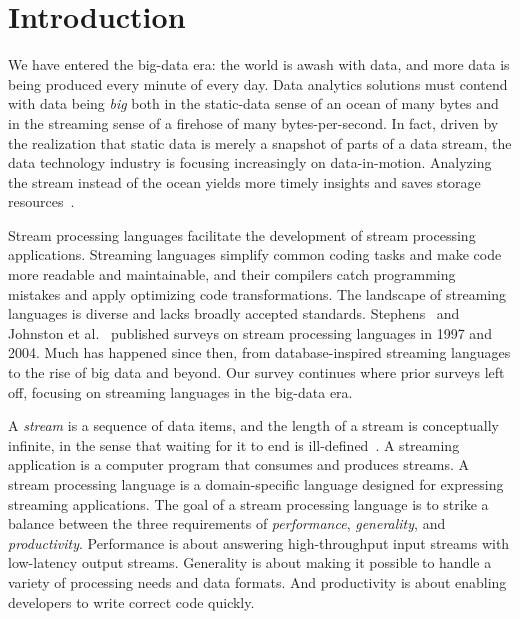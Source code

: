 \section{Introduction}\label{sec:introduction}

We have entered the big-data era: the world is awash with data, and
more data is being produced every minute of every day. Data analytics
solutions must contend with data being \emph{big} both in the static-data sense of
an ocean of many bytes and in the streaming sense of a firehose of
many bytes-per-second. In fact, driven by the realization that static
data is merely a snapshot of parts of a data stream, the data technology
industry is focusing increasingly on data-in-motion. Analyzing
the stream instead of the ocean yields more timely insights and saves
storage resources~\cite{andrade2014fundamentals}.

Stream processing languages facilitate the development of stream
processing applications. Streaming languages simplify common coding tasks
and make code more readable and maintainable, and their
compilers catch programming mistakes and apply optimizing code
transformations. The landscape of streaming languages is diverse and
lacks broadly accepted standards.  Stephens~\cite{stephens_1997} and
Johnston et al.~\cite{johnston_hanna_millar_2004} published surveys on
stream processing languages in 1997 and 2004. Much has happened since
then, from database-inspired streaming languages to the rise of big
data and beyond. Our survey continues where prior surveys left off,
focusing on streaming languages in the big-data era.

A \emph{stream} is a sequence of data items, and the length of a
stream is conceptually infinite, in the sense that waiting for it to
end is ill-defined~\cite{muthukrishnan2005data}. A streaming application is a computer program that
consumes and produces streams. A stream processing language is a
domain-specific language designed for expressing streaming
applications. The goal of a stream processing language is to strike a
balance between the three requirements of \emph{performance}, \emph{generality}, and
\emph{productivity}. Performance is about answering high-throughput input
streams with low-latency output streams. Generality is about making it
possible to handle a variety of processing needs and data formats. And
productivity is about enabling developers to write correct code
quickly.

